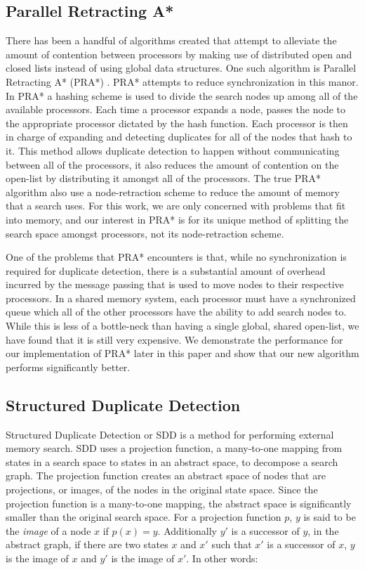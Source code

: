 \documentclass{article}
\begin{document}
\subsection{Parallel Retracting A*}

There has been a handful of algorithms created that attempt to
alleviate the amount of contention between processors by making use of
distributed open and closed lists instead of using global data
structures.  One such algorithm is Parallel Retracting A* (PRA*)
\cite{evett:pra}.  PRA* attempts to reduce synchronization in this
manor.  In PRA* a hashing scheme is used to divide the search nodes up
among all of the available processors.  Each time a processor expands
a node, passes the node to the appropriate processor dictated by the
hash function.  Each processor is then in charge of expanding and
detecting duplicates for all of the nodes that hash to it.  This
method allows duplicate detection to happen without communicating
between all of the processors, it also reduces the amount of
contention on the open-list by distributing it amongst all of the
processors.  The true PRA* algorithm also use a node-retraction scheme
to reduce the amount of memory that a search uses.  For this work, we
are only concerned with problems that fit into memory, and our
interest in PRA* is for its unique method of splitting the search
space amongst processors, not its node-retraction scheme.

One of the problems that PRA* encounters is that, while no
synchronization is required for duplicate detection, there is a
substantial amount of overhead incurred by the message passing that is
used to move nodes to their respective processors.  In a shared memory
system, each processor must have a synchronized queue which all of the
other processors have the ability to add search nodes to.  While this
is less of a bottle-neck than having a single global, shared
open-list, we have found that it is still very expensive.  We
demonstrate the performance for our implementation of PRA* later in
this paper and show that our new algorithm performs significantly
better.

\subsection{Structured Duplicate Detection}

Structured Duplicate Detection or SDD \cite{zhou:sdd} is a method for
performing external memory search.  SDD uses a projection function, a
many-to-one mapping from states in a search space to states in an
abstract space, to decompose a search graph.  The projection function
creates an abstract space of nodes that are projections, or images, of
the nodes in the original state space.  Since the projection function
is a many-to-one mapping, the abstract space is significantly smaller
than the original search space.  For a projection function $p$, $y$ is
said to be the \emph{image} of a node $x$ if $p(x) = y$.  Additionally
$y'$ is a successor of $y$, in the abstract graph, if there are two
states $x$ and $x'$ such that $x'$ is a successor of $x$, $y$ is the
image of $x$ and $y'$ is the image of $x'$.  In other words:
\end{document}
